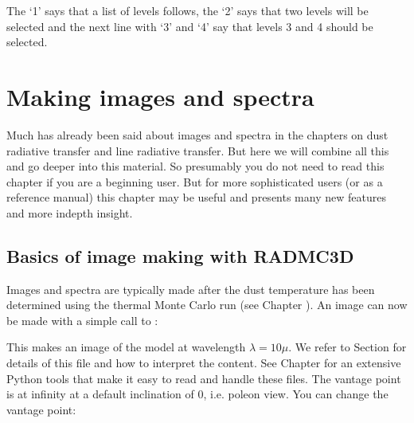 \documentclass[letterpaper,10pt,english]{sphinxmanual}
\begin{document}
The ‘1’ says that a list of levels follows, the ‘2’ says that two levels will be
selected and the next line with ‘3’ and ‘4’ say that levels 3 and 4 should be
selected.


\chapter{Making images and spectra}
\label{\detokenize{imagesspectra:making-images-and-spectra}}\label{\detokenize{imagesspectra:chap-images-spectra}}\label{\detokenize{imagesspectra::doc}}
Much has already been said about images and spectra in the chapters on
dust radiative transfer and line radiative transfer. But here we will
combine all this and go deeper into this material. So presumably you
do not need to read this chapter if you are a beginning user. But for
more sophisticated users (or as a reference manual) this chapter may
be useful and presents many new features and more in\sphinxhyphen{}depth insight.


\section{Basics of image making with RADMC\sphinxhyphen{}3D}
\label{\detokenize{imagesspectra:basics-of-image-making-with-radmc-3d}}\label{\detokenize{imagesspectra:sec-images}}
Images and spectra are typically made after the dust temperature has been
determined using the thermal Monte Carlo run (see Chapter {\hyperref[\detokenize{dustradtrans:chap-dust-transfer}]{}}).
An image can now be made with a simple call to
:

\begin{sphinxVerbatim}[commandchars=\\\{\}]
   
\end{sphinxVerbatim}

This makes an image of the model at wavelength \(\lambda=10\mu\). We refer to Section
{\hyperref[\detokenize{inputoutputfiles:sec-image-out}]{}} for details of this file and how to interpret the
content. See Chapter {\hyperref[\detokenize{pythontools:chap-python-analysis-tools}]{}} for an extensive Python tools
that make it easy to read and handle these files. The vantage point is
at infinity at a default inclination of 0, i.e. pole\sphinxhyphen{}on view. You can
change the vantage point:
\end{document}
